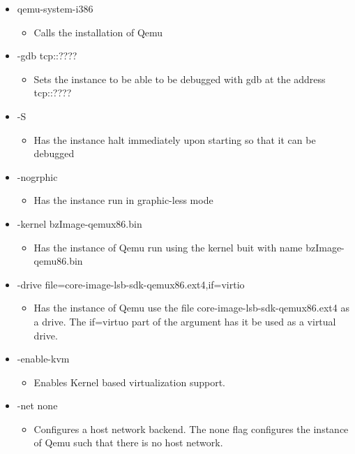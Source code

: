 \documentclass[onecolumn, draftclsnofoot,10pt, compsoc]{IEEEtran}
\begin{document}
    \begin{itemize}
        \item qemu-system-i386
            \begin{itemize}
                \item Calls the installation of Qemu
            \end{itemize}
        \item -gdb tcp::????
             \begin{itemize}
                \item Sets the instance to be able to be debugged with gdb at the address tcp::????
            \end{itemize}
        \item -S
            \begin{itemize}
                \item Has the instance halt immediately upon starting so that it can be debugged
            \end{itemize}
        \item -nogrphic
            \begin{itemize}
                \item Has the instance run in graphic-less mode
            \end{itemize}
        \item -kernel bzImage-qemux86.bin
            \begin{itemize}
                \item Has the instance of Qemu run using the kernel buit with name bzImage-qemu86.bin
            \end{itemize}
        \item -drive file=core-image-lsb-sdk-qemux86.ext4,if=virtio
            \begin{itemize}
                \item Has the instance of Qemu use the file core-image-lsb-sdk-qemux86.ext4 as a drive. The if=virtuo part of the argument has it be used as a virtual drive.
            \end{itemize}
        \item -enable-kvm
            \begin{itemize}
                \item Enables Kernel based virtualization support.
            \end{itemize}
        \item -net none
            \begin{itemize}
                \item Configures a host network backend. The none flag configures the instance of Qemu such that there is no host network.

\end{itemize}
\end{itemize}
\end{document}

